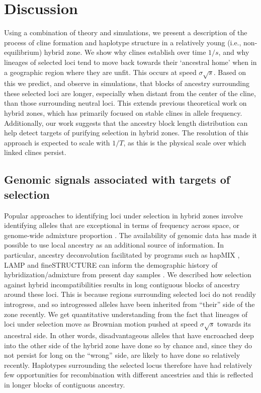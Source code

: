 \documentclass[11pt,letterpaper]{article}
\begin{document}
\section*{Discussion}

Using a combination of theory and simulations, we present a description of the process of cline formation and haplotype structure in a relatively young (i.e., non-equilibrium) hybrid zone. 
We show why clines establish over time $1/s$, 
and why lineages of selected loci tend to move back towards their `ancestral home' when in a geographic region where they are unfit. 
This occurs at speed $\sigma\sqrt{s}$. Based on this we predict, and observe in simulations, that blocks of ancestry surrounding these selected loci are longer, especially when distant from the center of the cline, than those surrounding neutral loci. 
This extends previous theoretical work on hybrid zones, which has primarily focused on stable clines in allele frequency. 
Additionally, our work suggests that the ancestry block length distribution can help detect targets of purifying selection in hybrid zones.  
The resolution of this approach is expected to scale with $1/T$, as this is the physical scale over which linked clines persist.  

\subsection*{Genomic signals associated with targets of selection}

Popular approaches to identifying loci under selection in hybrid zones 
involve identifying alleles that are exceptional in terms of frequency across space, or genome-wide admixture proportion \citep{Porter1997,Gompert2012}.  
The availability of genomic data has made it possible to use local ancestry as an additional source of information. 
In particular, ancestry deconvolution facilitated by programs such as  hapMIX \citep{Price2009}, LAMP \citep{Sankararaman2008} and fineSTRUCTURE \citep{Lawson2012} 
can inform the demographic history of hybridization/admixture from present day samples \citep[e.g.,][]{Hellenthal2014}. 
We described how selection against hybrid incompatibilities  
results in long contiguous blocks of ancestry around these loci. 
This is because regions surrounding selected loci do not readily introgress, 
and so introgressed alleles have been inherited from ``their'' side of the zone recently. %
We get quantitative understanding from the fact that lineages of
loci under selection move as Brownian motion pushed at speed $\sigma \sqrt{s}$ towards its ancestral side.
In other words, disadvantageous alleles that have encroached deep into the other side of the hybrid zone have done so by chance and, since they do not persist for long on the ``wrong'' side, are likely to have done so relatively recently. Haplotypes surrounding the selected locus therefore have had relatively few opportunities for recombination with different ancestries and this is reflected in longer blocks of contiguous ancestry.
\end{document}
